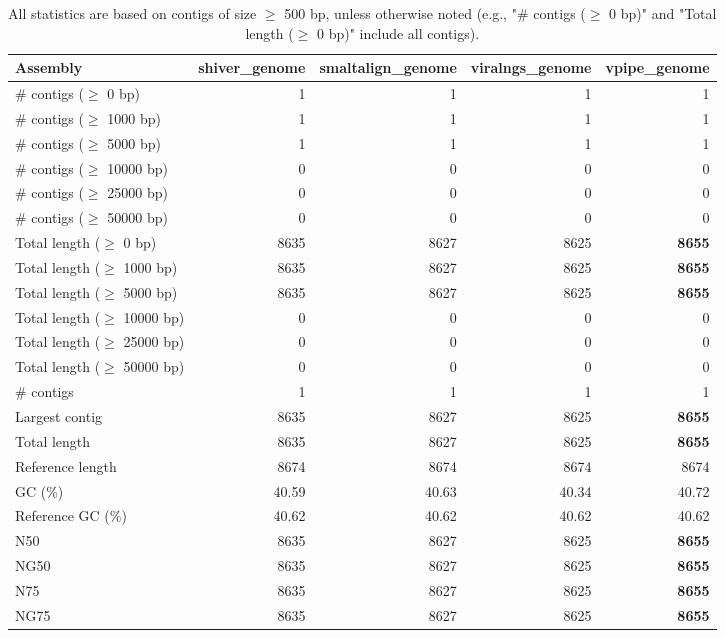 \documentclass[12pt,a4paper]{article}
\begin{document}
\begin{table}[ht]
\begin{center}
\caption{All statistics are based on contigs of size $\geq$ 500 bp, unless otherwise noted (e.g., "\# contigs ($\geq$ 0 bp)" and "Total length ($\geq$ 0 bp)" include all contigs).}
\begin{tabular}{|l*{4}{|r}|}
\hline
Assembly & shiver\_genome & smaltalign\_genome & viralngs\_genome & vpipe\_genome \\ \hline
\# contigs ($\geq$ 0 bp) & 1 & 1 & 1 & 1 \\ \hline
\# contigs ($\geq$ 1000 bp) & 1 & 1 & 1 & 1 \\ \hline
\# contigs ($\geq$ 5000 bp) & 1 & 1 & 1 & 1 \\ \hline
\# contigs ($\geq$ 10000 bp) & 0 & 0 & 0 & 0 \\ \hline
\# contigs ($\geq$ 25000 bp) & 0 & 0 & 0 & 0 \\ \hline
\# contigs ($\geq$ 50000 bp) & 0 & 0 & 0 & 0 \\ \hline
Total length ($\geq$ 0 bp) & 8635 & 8627 & 8625 & {\bf 8655} \\ \hline
Total length ($\geq$ 1000 bp) & 8635 & 8627 & 8625 & {\bf 8655} \\ \hline
Total length ($\geq$ 5000 bp) & 8635 & 8627 & 8625 & {\bf 8655} \\ \hline
Total length ($\geq$ 10000 bp) & 0 & 0 & 0 & 0 \\ \hline
Total length ($\geq$ 25000 bp) & 0 & 0 & 0 & 0 \\ \hline
Total length ($\geq$ 50000 bp) & 0 & 0 & 0 & 0 \\ \hline
\# contigs & 1 & 1 & 1 & 1 \\ \hline
Largest contig & 8635 & 8627 & 8625 & {\bf 8655} \\ \hline
Total length & 8635 & 8627 & 8625 & {\bf 8655} \\ \hline
Reference length & 8674 & 8674 & 8674 & 8674 \\ \hline
GC (\%) & 40.59 & 40.63 & 40.34 & 40.72 \\ \hline
Reference GC (\%) & 40.62 & 40.62 & 40.62 & 40.62 \\ \hline
N50 & 8635 & 8627 & 8625 & {\bf 8655} \\ \hline
NG50 & 8635 & 8627 & 8625 & {\bf 8655} \\ \hline
N75 & 8635 & 8627 & 8625 & {\bf 8655} \\ \hline
NG75 & 8635 & 8627 & 8625 & {\bf 8655} \\ \hline

\end{tabular}
\end{center}
\end{table}
\end{document}
